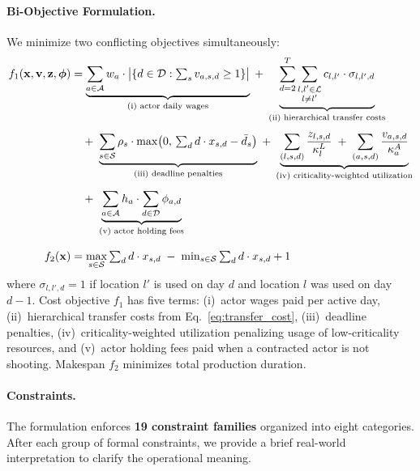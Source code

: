\paragraph{Bi-Objective Formulation.}
We minimize two conflicting objectives simultaneously:
\begin{align}
f_1(\mathbf{x}, \mathbf{v}, \mathbf{z}, \boldsymbol{\phi}) &= \underbrace{\sum_{a \in \mathcal{A}} w_a \cdot \bigl|\{d \in \mathcal{D} : \textstyle\sum_{s} v_{a,s,d} \geq 1\}\bigr|}_{\text{(i) actor daily wages}} \;+\; \underbrace{\sum_{d=2}^{T} \sum_{\substack{l, l' \in \mathcal{L} \\ l \neq l'}} c_{l,l'} \cdot \sigma_{l,l',d}}_{\text{(ii) hierarchical transfer costs}} \notag \\[4pt]
&\quad +\; \underbrace{\sum_{s \in \mathcal{S}} \rho_s \cdot \max\bigl(0,\, \textstyle\sum_{d} d \cdot x_{s,d} - \bar{d}_s\bigr)}_{\text{(iii) deadline penalties}} \;+\; \underbrace{\sum_{(l,s,d)} \frac{z_{l,s,d}}{\kappa^L_l} \;+\; \sum_{(a,s,d)} \frac{v_{a,s,d}}{\kappa^A_a}}_{\text{(iv) criticality-weighted utilization}} \notag \\[4pt]
&\quad +\; \underbrace{\sum_{a \in \mathcal{A}} h_a \cdot \sum_{d \in \mathcal{D}} \phi_{a,d}}_{\text{(v) actor holding fees}} \label{eq:cost}\\[8pt]
f_2(\mathbf{x}) &= \max_{s \in \mathcal{S}} \textstyle\sum_d d \cdot x_{s,d} \;-\; \min_{s \in \mathcal{S}} \textstyle\sum_d d \cdot x_{s,d} + 1 \label{eq:makespan}
\end{align}
where $\sigma_{l,l',d} = 1$ if location $l'$ is used on day $d$ and location $l$ was used on day $d{-}1$.
Cost objective $f_1$ has five terms: (i)~actor wages paid per active day, (ii)~hierarchical transfer costs from Eq.~\eqref{eq:transfer_cost}, (iii)~deadline penalties, (iv)~criticality-weighted utilization penalizing usage of low-criticality resources, and (v)~actor holding fees paid when a contracted actor is not shooting.
Makespan $f_2$ minimizes total production duration.

\paragraph{Constraints.}
The formulation enforces \textbf{19 constraint families} organized into eight categories.
After each group of formal constraints, we provide a brief real-world interpretation to clarify the operational meaning.

